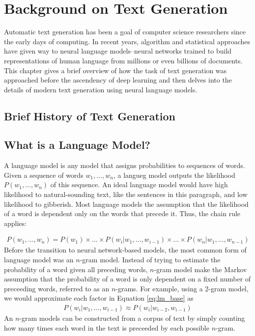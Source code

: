 \chapter{Background on Text Generation}
\label{chap:background}
Automatic text generation has been a goal of computer science researchers since the early days of computing.
In recent years, algorithm and statistical approaches have given way to neural language models--neural networks trained to build representations of human language from millions or even billions of documents.
This chapter gives a brief overview of how the task of text generation was approached before the ascendency of deep learning and then delves into the details of modern text generation using neural language models.

\section{Brief History of Text Generation}


\section{What is a Language Model?}
A language model is any model that assigns probabilities to sequences of words.
Given a sequence of words $w_1, \ldots, w_n$, a langueg model outputs the likelihood $P(w_1, \ldots, w_n)$ of this sequence.
An ideal language model would have high likelihood to natural-sounding text, like the sentences in this paragraph, and  low likelihood to gibberish.
Most language models the assumption that the likelihood of a word is dependent only on the words that precede it.
Thus, the chain rule applies:

\begin{align}
    \label{eq:lm_base}
    P(w_1, \ldots, w_n) = P(w_1) \times \ldots \times P(w_i | w_1, \ldots, w_{i-1}) \times \ldots \times P(w_n | w_1, \ldots, w_{n-1})
\end{align}
Before the transition to neural network-based models, the most common form of language model was an $n$-gram model.
Instead of trying to estimate the probability of a word given all preceding words, $n$-gram model make the Markov assumption that the probability of a word is only dependent on a fixed number of preceeding words, referred to as an $n$-grams.
For example, using a 2-gram model, we would approximate each factor in Equation \ref{eq:lm_base} as
\begin{align}
   P(w_i | w_1, \ldots, w_{i-1}) \approx P(w_i | w_{i-2}, w_{i-1})
\end{align}
An $n$-gram models can be constructed from a corpus of text by simply counting how many times each word in the text is preceeded by each possible $n$-gram.


